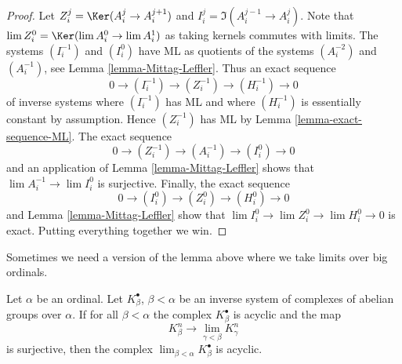 \begin{proof}
Let $Z^j_i = \Ker(A^j_i \to A^{j + 1}_i)$ and
$I^j_i = \Im(A^{j - 1}_i \to A^j_i)$.
Note that $\lim Z^0_i = \Ker(\lim A^0_i \to \lim A^1_i)$ as
taking kernels commutes with limits.
The systems $(I^{-1}_i)$ and $(I^0_i)$ have ML as quotients of
the systems $(A^{-2}_i)$ and $(A^{-1}_i)$, see
Lemma \ref{lemma-Mittag-Leffler}.
Thus an exact sequence
$$
0 \to (I^{-1}_i) \to (Z^{-1}_i) \to (H^{-1}_i) \to 0
$$
of inverse systems where $(I^{-1}_i)$ has ML
and where $(H^{-1}_i)$ is essentially constant by assumption.
Hence $(Z^{-1}_i)$ has ML by
Lemma \ref{lemma-exact-sequence-ML}.
The exact sequence
$$
0 \to (Z^{-1}_i) \to (A^{-1}_i) \to (I^0_i) \to 0
$$
and an application of
Lemma \ref{lemma-Mittag-Leffler}
shows that $\lim A^{-1}_i \to \lim I^0_i$ is surjective.
Finally, the exact sequence
$$
0 \to (I^0_i) \to (Z^0_i) \to (H^0_i) \to 0
$$
and
Lemma \ref{lemma-Mittag-Leffler}
show that $\lim I^0_i \to \lim Z^0_i \to \lim H^0_i \to 0$
is exact. Putting everything together we win.
\end{proof}

\noindent
Sometimes we need a version of the lemma above where we take limits
over big ordinals.

\begin{lemma}
\label{lemma-ML-over-ordinals}
Let $\alpha$ be an ordinal. Let $K_\beta^\bullet$, $\beta < \alpha$
be an inverse system of complexes of abelian groups over $\alpha$. If
for all $\beta < \alpha$ the complex $K_\beta^\bullet$ is acyclic and
the map
$$
K^n_\beta \longrightarrow \lim_{\gamma < \beta} K^n_\gamma
$$
is surjective, then the complex
$\lim_{\beta < \alpha} K_\beta^\bullet$ is acyclic.
\end{lemma}

